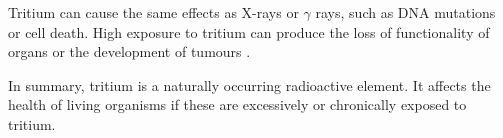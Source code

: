 Tritium can cause the same effects as X-rays or $\gamma$ rays, such as DNA mutations or cell death. High exposure to tritium can produce the loss of functionality of organs or the development of tumours \cite{StraumeTritiumHazard}. %


In summary, tritium is a naturally occurring radioactive element. It affects the health of living organisms if these are excessively or chronically exposed to tritium.


